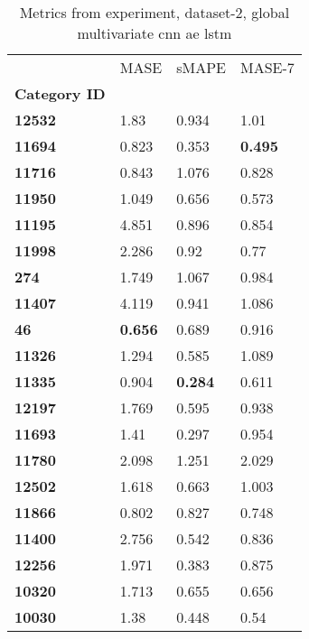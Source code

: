 \begin{table}[H]
\centering
\caption{Metrics from experiment, dataset-2, global multivariate cnn ae lstm}
\label{table:global-multivariate-cnn-ae-lstm-dataset-2}
\begin{tabular}{llll}
\toprule
{} &            MASE &           sMAPE &          MASE-7 \\
\textbf{Category ID} &                 &                 &                 \\
\midrule
\textbf{12532      } &            1.83 &           0.934 &            1.01 \\
\textbf{11694      } &           0.823 &           0.353 &  \textbf{0.495} \\
\textbf{11716      } &           0.843 &           1.076 &           0.828 \\
\textbf{11950      } &           1.049 &           0.656 &           0.573 \\
\textbf{11195      } &           4.851 &           0.896 &           0.854 \\
\textbf{11998      } &           2.286 &            0.92 &            0.77 \\
\textbf{274        } &           1.749 &           1.067 &           0.984 \\
\textbf{11407      } &           4.119 &           0.941 &           1.086 \\
\textbf{46         } &  \textbf{0.656} &           0.689 &           0.916 \\
\textbf{11326      } &           1.294 &           0.585 &           1.089 \\
\textbf{11335      } &           0.904 &  \textbf{0.284} &           0.611 \\
\textbf{12197      } &           1.769 &           0.595 &           0.938 \\
\textbf{11693      } &            1.41 &           0.297 &           0.954 \\
\textbf{11780      } &           2.098 &           1.251 &           2.029 \\
\textbf{12502      } &           1.618 &           0.663 &           1.003 \\
\textbf{11866      } &           0.802 &           0.827 &           0.748 \\
\textbf{11400      } &           2.756 &           0.542 &           0.836 \\
\textbf{12256      } &           1.971 &           0.383 &           0.875 \\
\textbf{10320      } &           1.713 &           0.655 &           0.656 \\
\textbf{10030      } &            1.38 &           0.448 &            0.54 \\
\bottomrule
\end{tabular}
\end{table}
